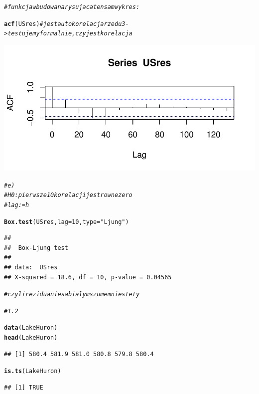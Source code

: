 \documentclass[10pt,a4paper,noindentfirst]{article}\usepackage[]{graphicx}\usepackage[]{color}
\makeatletter
\def\maxwidth{ %
  \ifdim\Gin@nat@width>\linewidth
    \linewidth
  \else
    \Gin@nat@width
  \fi
}
\newcommand{\hlnum}[1]{\textcolor[rgb]{0.686,0.059,0.569}{#1}}%
\newcommand{\hlstr}[1]{\textcolor[rgb]{0.192,0.494,0.8}{#1}}%
\newcommand{\hlcom}[1]{\textcolor[rgb]{0.678,0.584,0.686}{\textit{#1}}}%
\newcommand{\hlstd}[1]{\textcolor[rgb]{0.345,0.345,0.345}{#1}}%
\newcommand{\hlkwc}[1]{\textcolor[rgb]{0.333,0.667,0.333}{#1}}%
\newcommand{\hlkwd}[1]{\textcolor[rgb]{0.737,0.353,0.396}{\textbf{#1}}}%
\newenvironment{kframe}{%
 \def\at@end@of@kframe{}%
 \ifinner\ifhmode%
  \def\at@end@of@kframe{\end{minipage}}%
  \begin{minipage}{\columnwidth}%
 \fi\fi%
 \def\FrameCommand##1{\hskip\@totalleftmargin \hskip-\fboxsep
 \colorbox{shadecolor}{##1}\hskip-\fboxsep
     \hskip-\linewidth \hskip-\@totalleftmargin \hskip\columnwidth}%
 \MakeFramed {\advance\hsize-\width
   \@totalleftmargin\z@ \linewidth\hsize
   \@setminipage}}%
 {\par\unskip\endMakeFramed%
 \at@end@of@kframe}
\newenvironment{knitrout}{}{} %
\makeatother
\begin{document}
\begin{knitrout}
{}


\begin{kframe}\begin{alltt}
\hlcom{# funkcja wbudowana rysujaca ten sam wykres:}

\hlkwd{acf}\hlstd{(USres)}   \hlcom{# jest autokorelacja rzedu 3 -> testujemy formalnie, czy jest korelacja}
\end{alltt}
\end{kframe}

{\centering \includegraphics[width=\maxwidth]{figure/unnamed-chunk-32} 

}


\begin{kframe}\begin{alltt}
\hlcom{# e)}
\hlcom{# H0: pierwsze 10 korelacji jest rowne zero  }
\hlcom{# lag := h}

\hlkwd{Box.test}\hlstd{(USres,} \hlkwc{lag} \hlstd{=} \hlnum{10}\hlstd{,} \hlkwc{type}\hlstd{=}\hlstr{"Ljung"}\hlstd{)}
\end{alltt}
\begin{verbatim}
## 
## 	Box-Ljung test
## 
## data:  USres
## X-squared = 18.6, df = 10, p-value = 0.04565
\end{verbatim}
\begin{alltt}
\hlcom{# czyli rezidua nie sa bialym szumem niestety}

\hlcom{# 1.2}

\hlkwd{data}\hlstd{(LakeHuron)}
\hlkwd{head}\hlstd{(LakeHuron)}
\end{alltt}
\begin{verbatim}
## [1] 580.4 581.9 581.0 580.8 579.8 580.4
\end{verbatim}
\begin{alltt}
\hlkwd{is.ts}\hlstd{(LakeHuron)}
\end{alltt}
\begin{verbatim}
## [1] TRUE
\end{verbatim}
\end{kframe}
\end{knitrout}
\end{document}

